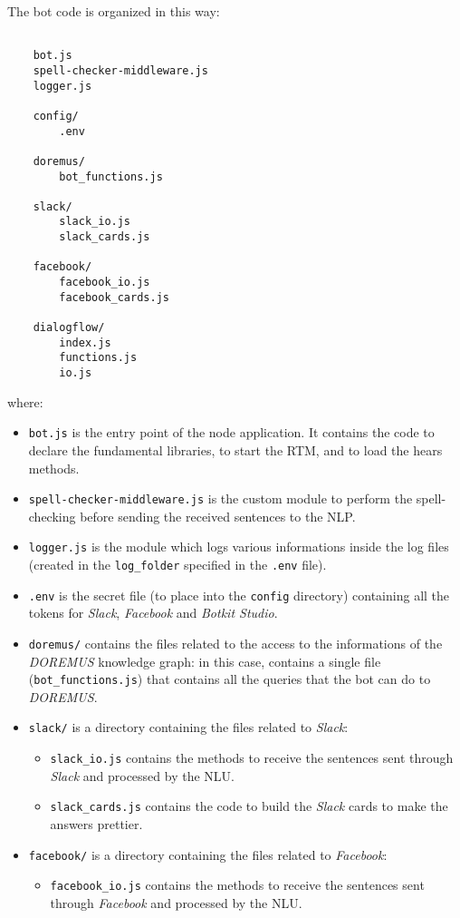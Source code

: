 	The bot code is organized in this way:
	\begin{lstlisting}
	
	bot.js
	spell-checker-middleware.js
	logger.js
	
	config/
		.env
	
	doremus/
		bot_functions.js
	
	slack/
		slack_io.js
		slack_cards.js
	
	facebook/
		facebook_io.js
		facebook_cards.js
		
	dialogflow/
		index.js
		functions.js
		io.js
	\end{lstlisting}
	where:
	\begin{itemize}
		\item \texttt{bot.js} is the entry point of the node application. It contains the code to declare the fundamental libraries, to start the RTM, and to load the hears methods.
		
		\item \texttt{spell-checker-middleware.js} is the custom module to perform the spell-checking before sending the received sentences to the NLP.
		
		\item \texttt{logger.js} is the module which logs various informations inside the log files (created in the \texttt{log\_folder} specified in the \texttt{.env} file).
		
		\item \texttt{.env} is the secret file (to place into the \texttt{config} directory) containing all the tokens for \textit{Slack}, \textit{Facebook} and \textit{Botkit Studio}.
		
		\item \texttt{doremus/} contains the files related to the access to the informations of the \textit{DOREMUS} knowledge graph: in this case, contains a single file (\texttt{bot\_functions.js}) that contains all the queries that the bot can do to \textit{DOREMUS}.
		
		\item \texttt{slack/} is a directory containing the files related to \textit{Slack}:
			\begin{itemize}
			\item \texttt{slack\_io.js} contains the methods to receive the sentences sent through \textit{Slack} and processed by the NLU.
			
			\item \texttt{slack\_cards.js} contains the code to build the \textit{Slack} cards to make the answers prettier.
			\end{itemize}
		\item \texttt{facebook/} is a directory containing the files related to \textit{Facebook}:
			\begin{itemize}
			\item \texttt{facebook\_io.js} contains the methods to receive the sentences sent through \textit{Facebook} and processed by the NLU.
			

\end{itemize}
\end{itemize}
